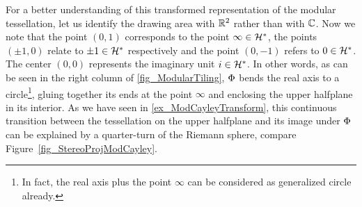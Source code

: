 For a better understanding of this transformed representation of the modular tessellation, let us identify the drawing area with $\mathbb{R}^2$ rather than with $\mathbb{C}$. Now we note that the point $(0,1)$ corresponds to the point $\infty \in \mathcal{H}^\ast$, the points $(\pm 1, 0)$ relate to $\pm 1 \in \mathcal{H}^\ast$ respectively and the point $(0,-1)$ refers to $0 \in \mathcal{H}^\ast$. The center $(0,0)$ represents the imaginary unit $i \in \mathcal{H}^\ast$. In other words, as can be seen in the right column of \ref{fig_ModularTiling}, $\Phi$ bends the real axis to a circle\footnote{In fact, the real axis plus the point $\infty$ can be considered as generalized circle already.}, gluing together its ends at the point $\infty$ and enclosing the upper halfplane in its interior. As we have seen in \ref{ex_ModCayleyTransform}, this continuous transition between the tessellation on the upper halfplane and its image under $\Phi$ can be explained by a quarter-turn of the Riemann sphere, compare Figure~\ref{fig_StereoProjModCayley}.
